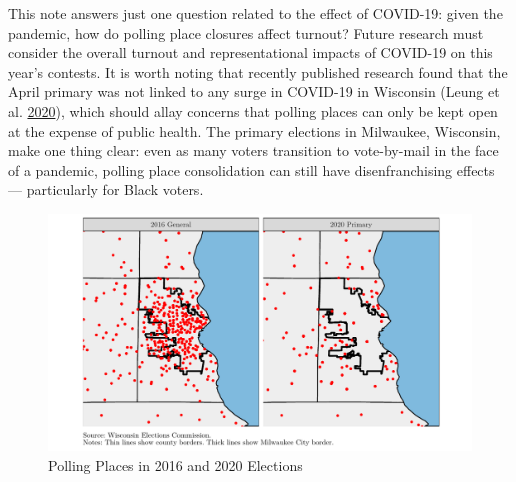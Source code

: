 \documentclass[
  12pt,
]{article}
\begin{document}
This note answers just one question related to the effect of COVID-19: given the pandemic, how do polling place closures affect turnout? Future research must consider the overall turnout and representational impacts of COVID-19 on this year's contests. It is worth noting that recently published research found that the April primary was not linked to any surge in COVID-19 in Wisconsin (Leung et al. \protect\hyperlink{ref-Leung2020}{2020}), which should allay concerns that polling places can only be kept open at the expense of public health. The primary elections in Milwaukee, Wisconsin, make one thing clear: even as many voters transition to vote-by-mail in the face of a pandemic, polling place consolidation can still have disenfranchising effects --- particularly for Black voters.

\newpage
\begin{figure}[H]

{\centering \includegraphics{mke_turnout_files/figure-latex/map-1} 

}

\caption{\label{fig:map}Polling Places in 2016 and 2020 Elections}\label{fig:map}
\end{figure}
\end{document}
